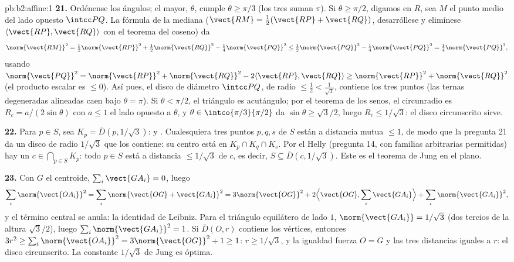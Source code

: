 \begin{solution}{pb:b2:affine:1}
\textbf{21.} Ordénense los ángulos; el mayor, $\theta$, cumple
$\theta \geq \pi/3$ (los tres suman $\pi$). Si $\theta \geq \pi/2$,
digamos en $R$, sea $M$ el punto medio del lado opuesto $\intcc PQ$.
La fórmula de la mediana ($\vect{RM} = \tfrac12(\vect{RP} +
\vect{RQ})$, desarróllese y elimínese $\langle\vect{RP},
\vect{RQ}\rangle$ con el teorema del coseno) da
\[
\norm{\vect{RM}}^2 = \tfrac12\norm{\vect{RP}}^2 +
\tfrac12\norm{\vect{RQ}}^2 - \tfrac14\norm{\vect{PQ}}^2 \leq
\tfrac12\norm{\vect{PQ}}^2 - \tfrac14\norm{\vect{PQ}}^2 =
\tfrac14\norm{\vect{PQ}}^2,
\]
usando $\norm{\vect{PQ}}^2 = \norm{\vect{RP}}^2 +
\norm{\vect{RQ}}^2 - 2\langle\vect{RP}, \vect{RQ}\rangle \geq
\norm{\vect{RP}}^2 + \norm{\vect{RQ}}^2$ (el producto escalar es
$\leq 0$). Así pues, el disco de diámetro $\intcc PQ$, de radio $\leq
\tfrac12 < \tfrac1{\sqrt3}$, contiene los tres puntos (las ternas
degeneradas alineadas caen bajo $\theta = \pi$). Si $\theta < \pi/2$,
el triángulo es acutángulo; por el teorema de los senos, el
circunradio es $R_c = a/(2\sin\theta)$ con $a \leq 1$ el lado opuesto
a $\theta$, y $\theta \in \intco{\pi/3}{\pi/2}$ da $\sin\theta \geq
\sqrt3/2$, luego $R_c \leq 1/\sqrt3$: el disco circunscrito sirve.

\textbf{22.} Para $p \in S$, sea $K_p = \overline D(p, 1/\sqrt3)$:
 y . Cualesquiera tres puntos $p, q, s$ de $S$ están
a distancia mutua $\leq 1$, de modo que la pregunta 21 da un disco de
radio $1/\sqrt3$ que los contiene: su centro está en $K_p \cap K_q
\cap K_s$. Por el Helly  (pregunta 14, con familias
arbitrarias permitidas) hay un $c \in \bigcap_{p\in S}K_p$: todo $p
\in S$ está a distancia $\leq 1/\sqrt3$ de $c$, es decir, $S
\subseteq \overline D(c, 1/\sqrt3)$. Este es el teorema de Jung en el
plano.

\textbf{23.} Con $G$ el centroide, $\sum_i\vect{GA_i} = 0$, luego
\[
\sum_i\norm{\vect{OA_i}}^2 = \sum_i\norm{\vect{OG} +
\vect{GA_i}}^2 = 3\norm{\vect{OG}}^2 + 2\Bigl\langle
\vect{OG}, \sum_i\vect{GA_i}\Bigr\rangle +
\sum_i\norm{\vect{GA_i}}^2,
\]
y el término central se anula: la identidad de Leibniz. Para el
triángulo equilátero de lado $1$, $\norm{\vect{GA_i}} = 1/\sqrt3$
(dos tercios de la altura $\sqrt3/2$), luego
$\sum_i\norm{\vect{GA_i}}^2 = 1$. Si $\overline D(O, r)$ contiene los
vértices, entonces $3r^2 \geq \sum_i\norm{\vect{OA_i}}^2 =
3\norm{\vect{OG}}^2 + 1 \geq 1$: $r \geq 1/\sqrt3$, y la igualdad
fuerza $O = G$ y las tres distancias iguales a $r$: el disco
circunscrito. La constante $1/\sqrt3$ de Jung es óptima.


\end{solution}
